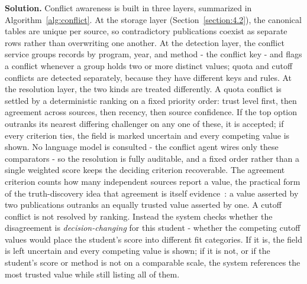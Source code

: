 \documentclass[../main.tex]{subfiles}
\begin{document}
\textbf{Solution.}
Conflict awareness is built in three layers, summarized in Algorithm~\ref{alg:conflict}.
At the storage layer (Section~\ref{section:4.2}), the canonical tables are unique per source, so contradictory publications coexist as separate rows rather than overwriting one another.
At the detection layer, the conflict service groups records by program, year, and method - the conflict key - and flags a conflict whenever a group holds two or more distinct values; quota and cutoff conflicts are detected separately, because they have different keys and rules.
At the resolution layer, the two kinds are treated differently.
A quota conflict is settled by a deterministic ranking on a fixed priority order: trust level first, then agreement across sources, then recency, then source confidence.
If the top option outranks its nearest differing challenger on any one of these, it is accepted; if every criterion ties, the field is marked uncertain and every competing value is shown.
No language model is consulted - the conflict agent wires only these comparators - so the resolution is fully auditable, and a fixed order rather than a single weighted score keeps the deciding criterion recoverable.
The agreement criterion counts how many independent sources report a value, the practical form of the truth-discovery idea that agreement is itself evidence~\cite{li2016truth}: a value asserted by two publications outranks an equally trusted value asserted by one.
A cutoff conflict is not resolved by ranking.
Instead the system checks whether the disagreement is \textit{decision-changing} for this student - whether the competing cutoff values would place the student's score into different fit categories.
If it is, the field is left uncertain and every competing value is shown; if it is not, or if the student's score or method is not on a comparable scale, the system references the most trusted value while still listing all of them.
\end{document}
